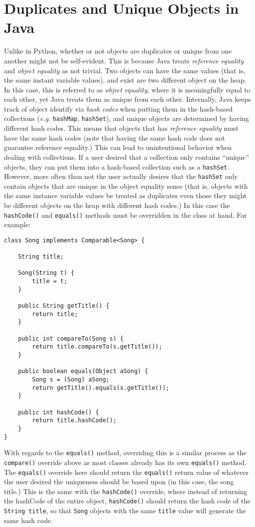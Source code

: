 \documentclass{tufte-handout}
\begin{document}
    \section*{Duplicates and Unique Objects in Java}
    Unlike in Python, whether or not objects are duplicates or unique from one another might not be self-evident. This is because Java treats \emph{reference equality} and \emph{object equality} as not trivial. Two objects can have the same values (that is, the same instant variable values), and exist are two different object on the heap. In this case, this is referred to as \emph{object equality}, where it is meaningfully equal to each other, yet Java treats them as unique from each other. Internally, Java keeps track of object identify via \emph{hash codes} when putting them in the hash-based collections (\textit{e.g.} \texttt{hashMap}, \texttt{hashSet}), and unique objects are determined by having different hash codes. This means that objects that has \emph{reference equality} must have the same hash codes (note that having the same hash code does not guarantee reference equality.) This can lead to unintentional behavior when dealing with collections. If a user desired that a collection only contains ``unique'' objects, they can put them into a hash-based collection such as a \texttt{hashSet}. However, more often than not the user actually desires that the \texttt{hashSet} only contain objects that are unique in the object equality sense (that is, objects with the same instance variable values be treated as duplicates even those they might be different objects on the heap with different hash codes.) In this case the \texttt{hashCode()} and \texttt{equals()} methods must be overridden in the class at hand. For example:

    \begin{lstlisting}
class Song implements Comparable<Song> {
    
    String title;

    Song(String t) {
        title = t;
    }

    public String getTitle() {
        return title;
    }

    public int compareTo(Song s) {
        return title.compareTo(s.getTitle());
    }

    public boolean equals(Object aSong) {
        Song s = (Song) aSong;
        return getTitle().equals(s.getTitle());
    }

    public int hashCode() {
        return title.hashCode();
    }
}
    \end{lstlisting}

    With regards to the \texttt{equals()} method, overriding this is a similar process as the \texttt{compare()} override above as most classes already has its own \texttt{equals()} method. The \texttt{equals()} override here should return the \texttt{equals()} return value of whatever the user desired the uniqueness should be based upon (in this case, the song title.) This is the same with the \texttt{hashCode()} override, where instead of returning the hashCode of the entire object, \texttt{hashCode()} should return the hash code of the \texttt{String title}, so that \texttt{Song} objects with the same \texttt{title} value will generate the same hash code. 
\end{document}
